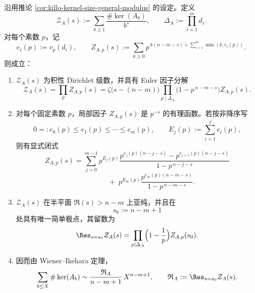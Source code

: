 \begin{theorem}\label{thm:xi-smith-kernel-dirichlet-euler-single-pole}
沿用推论 \ref{cor:killo-kernel-size-general-modulus} 的设定。定义
\[
\mathcal Z_A(s):=\sum_{b\ge 1}\frac{\#\ker(A_b)}{b^s},
\qquad
\Delta_A:=\prod_{i=1}^{m}d_i.
\]
对每个素数 \(p\)，记
\[
e_i(p):=v_p(d_i),
\qquad
Z_{A,p}(s):=
\sum_{k\ge 0}p^{\,k(n-m-s)+\sum_{i=1}^{m}\min(k,e_i(p))}.
\]
则成立：
\begin{enumerate}
\item \(\mathcal Z_A(s)\) 为积性 Dirichlet 级数，并具有 Euler 因子分解
\[
\mathcal Z_A(s)=\prod_{p}Z_{A,p}(s)
=
\zeta\!\bigl(s-(n-m)\bigr)
\prod_{p\mid \Delta_A}\bigl(1-p^{\,n-m-s}\bigr)Z_{A,p}(s).
\]
\item 对每个固定素数 \(p\)，局部因子 \(Z_{A,p}(s)\) 是 \(p^{-s}\) 的有理函数。若按非降序写
\[
0=:e_0(p)\le e_1(p)\le\cdots\le e_m(p),
\qquad
E_j(p):=\sum_{i=1}^{j}e_i(p),
\]
则有显式闭式
\[
Z_{A,p}(s)
=
\sum_{j=0}^{m-1}
p^{E_j(p)}
\frac{
p^{e_j(p)(n-j-s)}-p^{e_{j+1}(p)(n-j-s)}
}{
1-p^{\,n-j-s}
}
\]
\[
\qquad\qquad
+\;
p^{E_m(p)}
\frac{
p^{e_m(p)(n-m-s)}
}{
1-p^{\,n-m-s}
}.
\]
\item \(\mathcal Z_A(s)\) 在半平面 \(\Re(s)>n-m\) 上亚纯，并且在
\[
s_0:=n-m+1
\]
处具有唯一简单极点，其留数为
\[
\Res_{s=s_0}\mathcal Z_A(s)
=
\prod_{p\mid \Delta_A}\Bigl(1-\frac1p\Bigr)Z_{A,p}(s_0).
\]
\item 因而由 Wiener--Ikehara 定理，
\[
\sum_{b\le X}\#\ker(A_b)
\sim
\frac{\mathfrak R_A}{n-m+1}\,X^{n-m+1},
\qquad
\mathfrak R_A:=\Res_{s=s_0}\mathcal Z_A(s).
\]
\end{enumerate}
\end{theorem}
